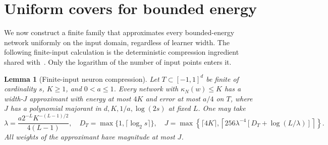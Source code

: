 \documentclass[11pt]{article}
\newtheorem{lemma}[theorem]{Lemma}\newtheorem{corollary}[theorem]{Corollary}
\theoremstyle{remark}\newtheorem{remark}[theorem]{Remark}
\begin{document}
\section{Uniform covers for bounded energy}\label{sec:energy-cover}
We now construct a finite family that approximates every bounded-energy
network uniformly on the input domain, regardless of learner width.
The following finite-input calculation is the deterministic compression
ingredient shared with~\cite{nongaus}. Only the logarithm of the number
of input points enters it.

\begin{lemma}[Finite-input neuron compression]\label{lem:compression}
Let $T\subset[-1,1]^d$ be finite of cardinality $s$, $K\geq1$, and
$0<a\leq1$. Every network with $\kappa_N(w)\leq K$ has a
width-$J$ approximant with energy at most $4K$ and error at most $a/4$
on $T$, where $J$ has a polynomial majorant in
$d,K,1/a,\log(2s)$ at fixed $L$. One may take
\[
 \lambda=\frac{a2^{-L}K^{-(L-1)/2}}{4(L-1)},\quad
 D_T=\max\{1,\lceil\log_2s\rceil\},\quad
 J=\max\left\{\lceil4K\rceil,
 \left\lceil256\lambda^{-4}[D_T+\log(L/\lambda)]\right\rceil\right\}.
\]
All weights of the approximant have magnitude at most $J$.
\end{lemma}
\end{document}
